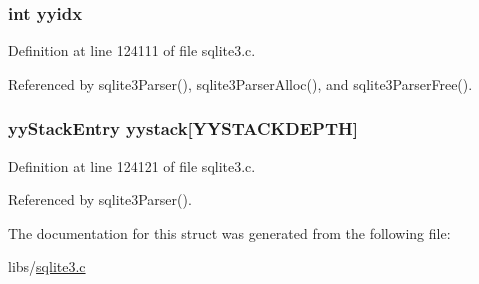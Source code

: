 \hypertarget{structyy_parser_aa2a03c2f11e7c7623c34ea15f4dcf792}{}
\subsubsection[{yyidx}]{\setlength{\rightskip}{0pt plus 5cm}int yyidx}\label{structyy_parser_aa2a03c2f11e7c7623c34ea15f4dcf792}


Definition at line 124111 of file sqlite3.\+c.



Referenced by sqlite3\+Parser(), sqlite3\+Parser\+Alloc(), and sqlite3\+Parser\+Free().

\hypertarget{structyy_parser_a36a200ba103b374705d58ec9de30632e}{}
\subsubsection[{yystack}]{ {\bf yy\+Stack\+Entry} yystack\mbox{[}{\bf Y\+Y\+S\+T\+A\+C\+K\+D\+E\+P\+T\+H}\mbox{]}}\label{structyy_parser_a36a200ba103b374705d58ec9de30632e}


Definition at line 124121 of file sqlite3.\+c.



Referenced by sqlite3\+Parser().



The documentation for this struct was generated from the following file\+:\begin{DoxyCompactItemize}
\item 
libs/\hyperlink{sqlite3_8c}{sqlite3.\+c}\end{DoxyCompactItemize}
